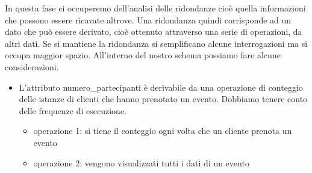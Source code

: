 
In questa fase ci occuperemo dell'analisi delle ridondanze cioè quella informazioni che possono essere ricavate altrove.
Una ridondanza quindi corrisponde ad un dato che può essere derivato, cioè ottenuto attraverso una serie di operazioni, da altri dati.
Se si mantiene la ridondanza si semplificano alcune interrogazioni ma si occupa maggior spazio.
All'interno del nostro schema possiamo fare alcune considerazioni.

\begin{itemize}
    \item L'attributo numero{\_}partecipanti è derivabile da una operazione di conteggio delle istanze di clienti che hanno prenotato un evento.
    Dobbiamo tenere conto delle frequenze di esecuzione.
    \begin{itemize}
        \item operazione 1: si tiene il conteggio ogni volta che un cliente prenota un evento
        \item operazione 2: vengono visualizzati tutti i dati di un evento
    \end{itemize}
\end{itemize}